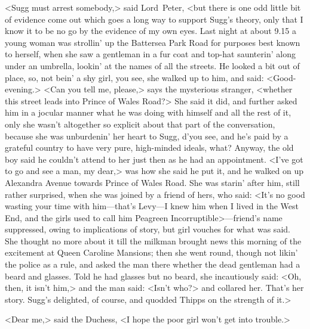 <Sugg must arrest somebody,> said Lord~Peter, <but there is one odd little bit of evidence come out which goes a long way to support Sugg's theory, only that I know it to be no go by the evidence of my own eyes. Last night at about 9.15 a young woman was strollin' up the Battersea Park Road for purposes best known to herself, when she saw a gentleman in a fur coat and top-hat saunterin' along under an umbrella, lookin' at the names of all the streets. He looked a bit out of place, so, not bein' a shy girl, you see, she walked up to him, and said: <Good-evening.> <Can you tell me, please,> says the mysterious stranger, <whether this street leads into Prince of Wales Road?> She said it did, and further asked him in a jocular manner what he was doing with himself and all the rest of it, only she wasn't altogether so explicit about that part of the conversation, because she was unburdenin' her heart to Sugg, d'you see, and he's paid by a grateful country to have very pure, high-minded ideals, what? Anyway, the old boy said he couldn't attend to her just then as he had an appointment. <I've got to go and see a man, my dear,> was how she said he put it, and he walked on up Alexandra Avenue towards Prince of Wales Road. She was starin' after him, still rather surprised, when she was joined by a friend of hers, who said: <It's no good wasting your time with him—that's Levy—I knew him when I lived in the West End, and the girls used to call him Peagreen Incorruptible>—friend's name suppressed, owing to implications of story, but girl vouches for what was said. She thought no more about it till the milkman brought news this morning of the excitement at Queen Caroline Mansions; then she went round, though not likin' the police as a rule, and asked the man there whether the dead gentleman had a beard and glasses. Told he had glasses but no beard, she incautiously said: <Oh, then, it isn't him,> and the man said: <Isn't who?> and collared her. That's her story. Sugg's delighted, of course, and quodded Thipps on the strength of it.>

<Dear me,> said the Duchess, <I hope the poor girl won't get into trouble.>

